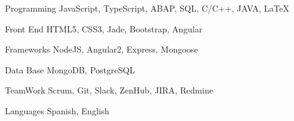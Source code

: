 


\begin{cvskills}


\cvskill
{Programming} %
{JavaScript, TypeScript, ABAP, SQL, C/C++, JAVA, \LaTeX{}} %

\cvskill
{Front End} %
{HTML5, CSS3, Jade, Bootstrap, Angular} %

\cvskill
{Frameworks} %
{NodeJS, Angular2, Express, Mongoose} %

\cvskill
{Data Base} %
{MongoDB, PostgreSQL} %

\cvskill
{TeamWork} %
{Scrum, Git, Slack, ZenHub, JIRA, Redmine} %

\cvskill
{Languages} %
{Spanish, English} %


\end{cvskills}

